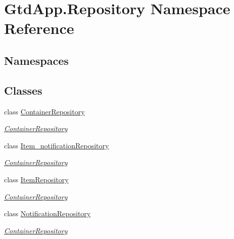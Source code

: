 \hypertarget{namespace_gtd_app_1_1_repository}{}\section{Gtd\+App.\+Repository Namespace Reference}
\label{namespace_gtd_app_1_1_repository}
\subsection*{Namespaces}
\begin{DoxyCompactItemize}
\end{DoxyCompactItemize}
\subsection*{Classes}
\begin{DoxyCompactItemize}
\item 
class \mbox{\hyperlink{class_gtd_app_1_1_repository_1_1_container_repository}{Container\+Repository}}
\begin{DoxyCompactList}\small\item\em \mbox{\hyperlink{class_gtd_app_1_1_repository_1_1_container_repository}{Container\+Repository}} \end{DoxyCompactList}\item 
class \mbox{\hyperlink{class_gtd_app_1_1_repository_1_1_item__notification_repository}{Item\+\_\+notification\+Repository}}
\begin{DoxyCompactList}\small\item\em \mbox{\hyperlink{class_gtd_app_1_1_repository_1_1_container_repository}{Container\+Repository}} \end{DoxyCompactList}\item 
class \mbox{\hyperlink{class_gtd_app_1_1_repository_1_1_item_repository}{Item\+Repository}}
\begin{DoxyCompactList}\small\item\em \mbox{\hyperlink{class_gtd_app_1_1_repository_1_1_container_repository}{Container\+Repository}} \end{DoxyCompactList}\item 
class \mbox{\hyperlink{class_gtd_app_1_1_repository_1_1_notification_repository}{Notification\+Repository}}
\begin{DoxyCompactList}\small\item\em \mbox{\hyperlink{class_gtd_app_1_1_repository_1_1_container_repository}{Container\+Repository}} \end{DoxyCompactList}\item 

\end{DoxyCompactItemize}
